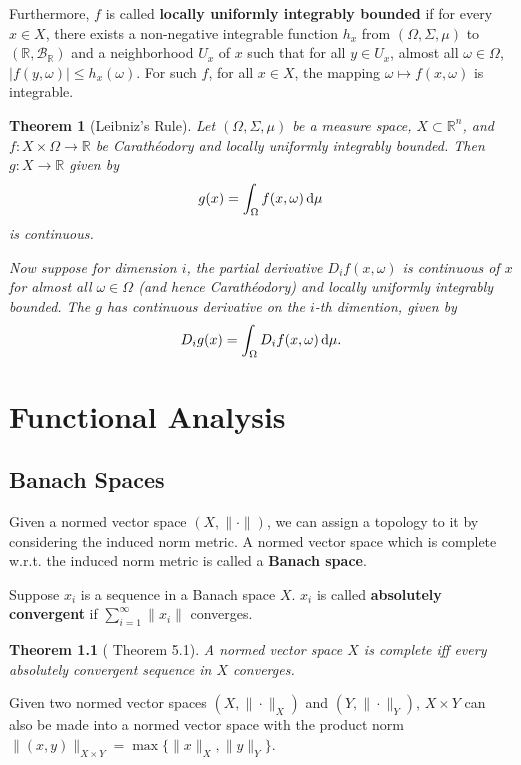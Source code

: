 \documentclass[openany]{book}
\newtheorem{theorem}{Theorem}[chapter]
\theoremstyle{definition}
\theoremstyle{remark}
\begin{document}
Furthermore, $f$ is called \textbf{locally uniformly integrably bounded} if for every $x\in X$, there exists a non-negative integrable function $h_x$ from $(\Omega,\Sigma,\mu)$ to $(\mathbb{R},\mathcal{B}_{\mathbb{R}})$ and a neighborhood $U_x$ of $x$ such that for all $y\in U_x$, almost all $\omega\in\Omega$, $|f(y,\omega)|\le h_x(\omega)$. For such $f$, for all $x\in X$, the mapping $\omega\mapsto f(x,\omega)$ is integrable.
\begin{theorem}[Leibniz's Rule]
    Let $(\Omega,\Sigma,\mu)$ be a measure space, $X\subset \mathbb{R}^n$, and $f:X\times\Omega\to \mathbb{R}$ be Carath\'{e}odory and locally uniformly integrably bounded. Then $g:X\to \mathbb{R}$ given by
    \begin{equation*}
        g(x)=\int_{\Omega} f(x,\omega)\dif\mu
    \end{equation*}
    is continuous.

    Now suppose for dimension $i$, the partial derivative $D_if(x,\omega)$ is continuous of $x$ for almost all $\omega\in\Omega$ (and hence Carath\'{e}odory) and locally uniformly integrably bounded. The $g$ has continuous derivative on the $i$-th dimention, given by
    \begin{equation*}
        D_ig(x)=\int_{\Omega}D_if(x,\omega)\dif\mu.
    \end{equation*}
\end{theorem}

\chapter{Functional Analysis} %
\section{Banach Spaces}
Given a normed vector space $(X,\|\cdot\|)$, we can assign a topology to it by considering the induced norm metric. A normed vector space which is complete w.r.t. the induced norm metric is called a \textbf{Banach space}.

Suppose $x_i$ is a sequence in a Banach space $X$. $x_i$ is called \textbf{absolutely convergent} if $\sum_{i=1}^{\infty}\|x_i\|$ converges.
\begin{theorem}[\cite{F13} Theorem 5.1]
    A normed vector space $X$ is complete iff every absolutely convergent sequence in $X$ converges.
\end{theorem}

Given two normed vector spaces $(X,\|\cdot\|_X)$ and $(Y,\|\cdot\|_Y)$, $X\times Y$ can also be made into a normed vector space with the product norm $\|(x,y)\|_{X\times Y}=\max\{\|x\|_X,\|y\|_Y\}$.
\end{document}
